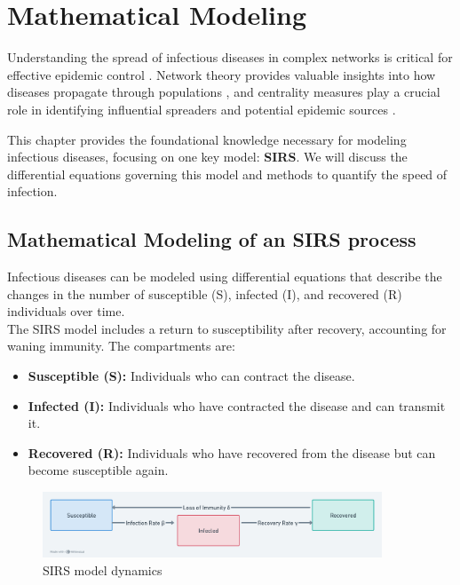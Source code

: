 \chapter{Mathematical Modeling}

Understanding the spread of infectious diseases in complex networks is critical for effective epidemic control \cite{hellewell2020, britton2021}. Network theory provides valuable insights into how diseases propagate through populations \cite{newman2010}, and centrality measures play a crucial role in identifying influential spreaders and potential epidemic sources \cite{gomez2011}.

This chapter provides the foundational knowledge necessary for modeling infectious diseases, focusing on one key model: \textbf{SIRS}. We will discuss the differential equations governing this model and methods to quantify the speed of infection.

\section{Mathematical Modeling of an SIRS process}
Infectious diseases can be modeled using differential equations that describe the changes in the number of susceptible (S), infected (I), and recovered (R) individuals over time.\\
\noindent
The SIRS model includes a return to susceptibility after recovery, accounting for waning immunity. The compartments are:
\begin{itemize}
    \item \textbf{Susceptible (S):} Individuals who can contract the disease.
    \item \textbf{Infected (I):} Individuals who have contracted the disease and can transmit it.
    \item \textbf{Recovered (R):} Individuals who have recovered from the disease but can become susceptible again.
\end{itemize}

\begin{figure}[H]
    \centering
    \includegraphics[width=0.9\textwidth]{img/SIRS_Model_Dynamics.png}
    \caption{SIRS model dynamics}
    \label{fig:SIRS_Model_Dynamics}
\end{figure}

